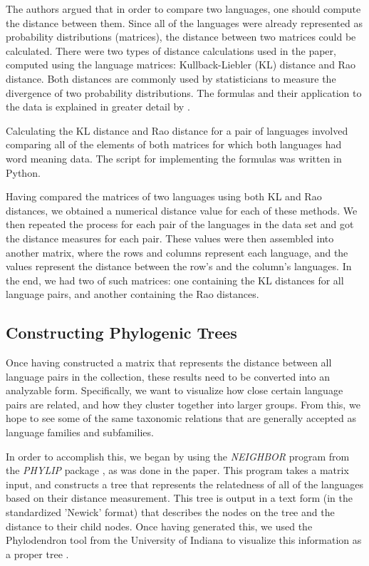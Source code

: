 \documentclass[10pt,a4]{article}
\begin{document}
The authors argued that in order to compare two languages, one should compute the distance between them. Since all of the languages were already represented as probability distributions (matrices), the distance between two matrices could be calculated. There were two types of distance calculations used in the paper, computed using the language matrices: Kullback-Liebler (KL) distance and Rao distance. Both distances are commonly used by statisticians to measure the divergence of two probability distributions.  The formulas and their application to the data is explained in greater detail by .

Calculating the KL distance and Rao distance for a pair of languages involved comparing all of the elements of both matrices for which both languages had word meaning data. The script for implementing the formulas was written in Python. 

Having compared the matrices of two languages using both KL and Rao distances, we obtained a numerical distance value for each of these methods. We then repeated the process for each pair of the languages in the data set and got the distance measures for each pair. These values were then assembled into another matrix, where the rows and columns represent each language, and the values represent the distance between the row's and the column's languages. In the end, we had two of such matrices: one containing the KL distances for all language pairs, and another containing the Rao distances.

\subsection{Constructing Phylogenic Trees}

Once having constructed a matrix that represents the distance between all language pairs in the collection, these results need to be converted into an analyzable form.  Specifically, we want to visualize how close certain language pairs are related, and how they cluster together into larger groups.  From this, we hope to see some of the same taxonomic relations that are generally accepted as language families and subfamilies.

In order to accomplish this, we began by using the \textit{NEIGHBOR} program from the \textit{PHYLIP} package \cite{web:phylip}, as was done in the paper.  This program takes a matrix input, and constructs a tree that represents the relatedness of all of the languages based on their distance measurement.  This tree is output in a text form (in the standardized 'Newick' format) that describes the nodes on the tree and the distance to their child nodes.  Once having generated this, we used the Phylodendron tool from the University of Indiana to visualize this information as a proper tree \cite{web:phylodendron}.  
\end{document}
